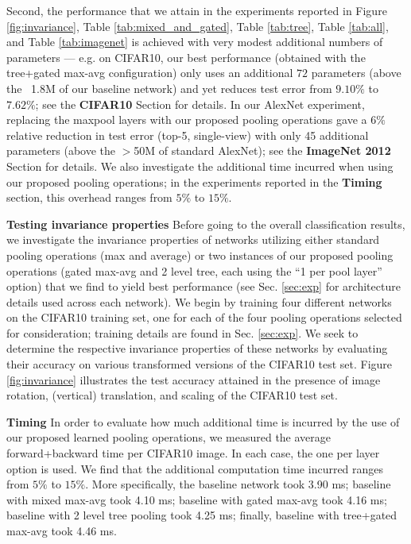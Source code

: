 \documentclass[twoside]{article}
\begin{document}
\vspace{-.5mm}
Second, the performance that we attain in the experiments reported in
Figure \ref{fig:invariance}, Table \ref{tab:mixed_and_gated}, Table \ref{tab:tree}, Table \ref{tab:all}, and
Table \ref{tab:imagenet} is achieved with very modest additional
numbers of parameters --- e.g. on CIFAR10, our best performance (obtained with the 
tree+gated max-avg configuration) only uses an additional $72$ parameters 
(above the ~1.8M of our baseline network) and yet reduces test error from $9.10\%$ 
to $7.62\%$; see the \textbf{CIFAR10} Section for details. In our AlexNet experiment, replacing the 
maxpool layers with our proposed pooling operations gave a $6\%$ relative reduction 
in test error (top-5, single-view) with only 45 additional parameters (above the $>$50M 
of standard AlexNet); see the \textbf{ImageNet 2012} Section for details. We also 
investigate the additional time incurred when using our proposed pooling operations;
in the experiments reported in the \textbf{Timing} section, this overhead ranges from $5\%$ to $15\%$.

\vspace{-.7mm}
\textbf{Testing invariance properties}
Before going to the overall classification results, we investigate the invariance
properties of networks utilizing either standard pooling operations (max and average)
or two instances of our proposed pooling operations (gated max-avg and 2 level tree, 
each using the ``1 per pool layer'' option) that we find to yield best performance 
(see Sec. \ref{sec:exp} for architecture details used across each network). We begin 
by training four different networks on the CIFAR10 training set, one for each of 
the four pooling operations selected for consideration; training details are found in Sec. 
\ref{sec:exp}. We seek to determine the respective invariance properties of these 
networks by evaluating their accuracy on various transformed versions of 
the CIFAR10 test set. Figure \ref{fig:invariance} illustrates the test accuracy 
attained in the presence of image rotation, (vertical) translation, and scaling 
of the CIFAR10 test set.  

\textbf{Timing}
In order to evaluate how much additional time is incurred by the use of our proposed learned pooling operations, we 
measured the average forward+backward time per CIFAR10 image. In each case, the one per layer option is used. We find 
that the additional computation time incurred ranges from $5\%$ to $15\%$. More specifically, the baseline
network took 3.90 ms; baseline with mixed max-avg took 4.10 ms; baseline with gated max-avg took 4.16 ms; baseline with 
2 level tree pooling took 4.25 ms; finally, baseline with tree+gated max-avg took 4.46 ms. 
\vspace{-4mm}
\end{document}
